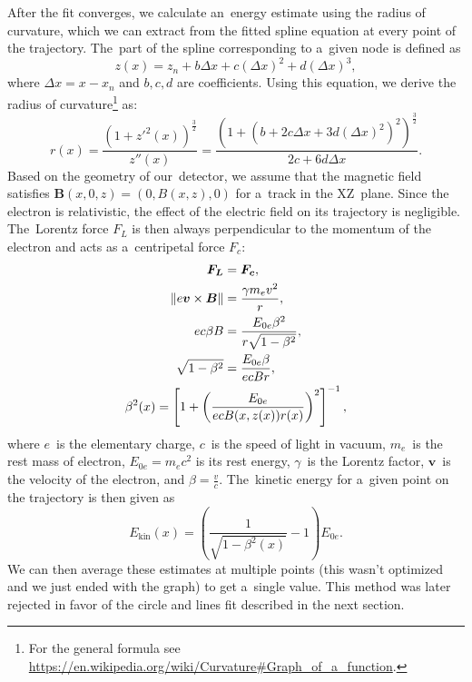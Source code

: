 		After the fit converges, we calculate an~energy estimate using the radius of curvature, which we can extract from the fitted spline equation at every point of the trajectory. The~part of the spline corresponding to a~given node is defined as
			\begin{equation}
				z(x) = z_n + b \Delta x+c(\Delta x)^2+d(\Delta x)^3,
			\end{equation}
		where $\Delta x = x-x_n$ and $b,c,d$ are coefficients. Using this equation, we derive the radius of curvature\footnote{For the general formula see \url{https://en.wikipedia.org/wiki/Curvature\#Graph_of_a_function}.} as:
			\begin{equation}
				r(x) = \frac{\left(1+z'^2(x)\right)^\frac{3}{2}}{z''(x)} = \frac{\left(1+\left(b+2c\Delta x+3d(\Delta x)^2\right)^2\right)^\frac{3}{2}}{2c+6d\Delta x}.
			\end{equation}
		Based on the geometry of our~detector, we assume that the magnetic field satisfies $\bm{B}(x,0,z) = (0,B(x,z),0)$ for a~track in the XZ~plane. Since the electron is relativistic, the effect of the electric field on its trajectory is negligible. The~Lorentz force $F_L$ is then always perpendicular to the momentum of the electron and acts as a~centripetal force $F_c$:
			\begin{gather}
				\begin{aligned}
					\bm{F_L} &= \bm{F_c},\\
					\norm{e\bm{v}\times\bm{B}} &= \frac{\gamma m_e v^2}{r},\\
					e c\beta B &= \frac{E_{0e} \beta^2}{r\sqrt{1-\beta^2}},\\
					\sqrt{1-\beta^2} &= \frac{E_{0e} \beta}{ecBr},
				\end{aligned}\\
				\beta^2(x) = \left[1+\left(\frac{E_{0e}}{ecB(x,z(x))r(x)}\right)^2\right]^{-1}, \label{eq:ekin1}
			\end{gather}
		where $e$~is the elementary charge, $c$~is the speed of light in vacuum, $m_e$~is the rest mass of electron, $E_{0e} = m_e c^2$ is its rest energy, $\gamma$~is the Lorentz factor, $\bm{v}$~is the velocity of the electron, and $\beta = \frac{v}{c}$. The~kinetic energy for a~given point on the trajectory is then given as
			\begin{equation}
				\label{eq:ekin2}
				E_\text{kin}(x) = \left(\frac{1}{\sqrt{1-\beta^2(x)}}-1\right)E_{0e}.
			\end{equation}
		We can then average these estimates at multiple points (this wasn't optimized and we just ended with the graph) to get a~single value. This method was later rejected in favor of the circle and lines fit described in the next section.
		
